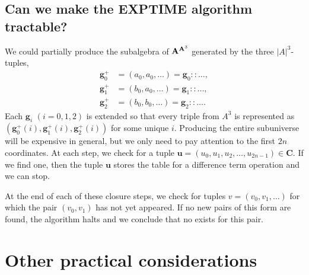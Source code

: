\subsection{Can we make the {\small EXPTIME} algorithm tractable?}
We could partially produce the subalgebra of $\mathbf{A}^{\mathbf{A}^3}$ generated by
the three $|A|^3$-tuples,
\begin{align*}
\mathbf{g}^+_0 &= (a_0, a_0, \dots) = \mathbf{g}_0 :: \dots,\\
\mathbf{g}^+_1 &= (b_0, a_0, \dots) = \mathbf{g}_1 :: \dots,\\
\mathbf{g}^+_2 &= (b_0, b_0, \dots) = \mathbf{g}_2 :: \dots.
\end{align*}
Each $\mathbf{g}_i$ $(i=0,1,2)$ is extended so that every 
triple from $A^3$ is represented as $(\mathbf{g}^+_0(i), \mathbf{g}^+_1(i), \mathbf{g}^+_2(i))$ for some 
unique $i$.  Producing the entire subuniverse will be expensive in 
general, but we only need to pay attention to the first $2n$ coordinates. 
At each step, we check for a tuple $\mathbf{u} = (u_0, u_1, u_2, \dots, u_{2n-1})\in \mathbf{C}$.  
If we find one, then the tuple $\mathbf{u}$ stores
the table for a difference term operation and we can stop.

At the end of each of these closure steps, we check for 
tuples $v = (v_0, v_1, \dots)$ for which the pair $(v_0, v_1)$ has not
yet appeared.  If no new pairs of this form are found, the algorithm halts
and we conclude that no \ldto exists for this pair.

\section{Other practical considerations}
